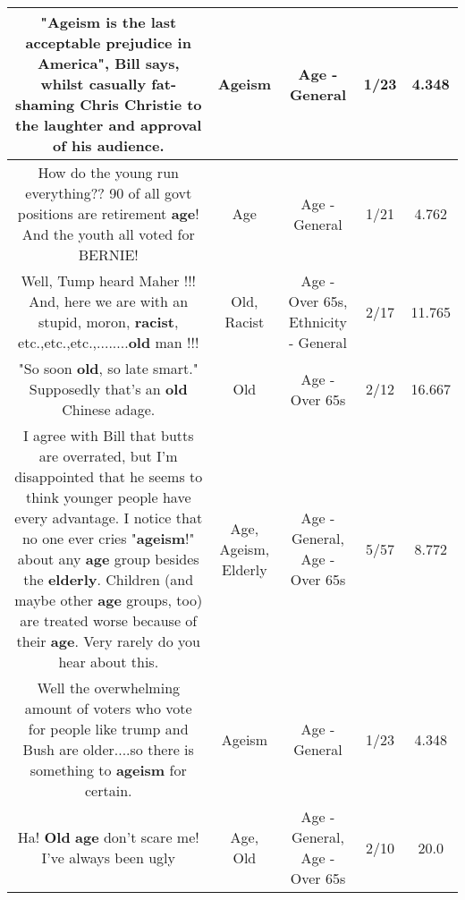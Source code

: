 \documentclass[11pt]{article}
\newlength\mylength
\begin{document}
\begin{center}
\begin{longtable}{|C{.65\mylength}|C{.30\mylength}|C{.12\mylength}|C{.12\mylength}|C{.12\mylength}|}
  \small "\textbf{Ageism} is the last acceptable prejudice in America", Bill says, whilst casually fat-shaming Chris Christie to the laughter and approval of his audience.\normalsize   & Ageism & Age - General & 1/23 & 4.348 \\  \hline
  \small How do the young run everything?? 90 of all govt positions are retirement \textbf{age}! And the youth all voted for BERNIE!\normalsize   & Age & Age - General & 1/21 & 4.762 \\  \hline
  \small Well,  Tump heard Maher !!!    And, here we are with an stupid, moron, \textbf{racist}, etc.,etc.,etc.,........\textbf{old} man !!!\normalsize   & Old, Racist & Age - Over 65s, Ethnicity - General & 2/17 & 11.765 \\  \hline
  \small "So soon \textbf{old}, so late smart." Supposedly that's an \textbf{old} Chinese adage.\normalsize   & Old & Age - Over 65s & 2/12 & 16.667 \\  \hline
  \small I agree with Bill that butts are overrated, but I'm disappointed that he seems to think younger people have every advantage. I notice that no one ever cries "\textbf{ageism}!" about any \textbf{age} group besides the \textbf{elderly}. Children (and maybe other \textbf{age} groups, too) are treated worse because of their \textbf{age}. Very rarely do you hear about this.\normalsize   & Age, Ageism, Elderly & Age - General, Age - Over 65s & 5/57 & 8.772 \\  \hline
  \small Well the overwhelming amount of voters who vote for people like trump and Bush are older....so there is something to \textbf{ageism} for certain.\normalsize   & Ageism & Age - General & 1/23 & 4.348 \\  \hline
  \small Ha! \textbf{Old} \textbf{age} don't scare me! I've always been ugly\normalsize   & Age, Old & Age - General, Age - Over 65s & 2/10 & 20.0 \\  \hline

\end{longtable}
\end{center}
\end{document}
